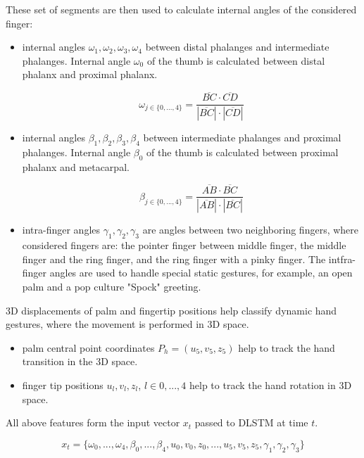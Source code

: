 These set of segments are then used to calculate internal angles of the considered finger:
\begin{itemize}
    \item internal angles $\omega_1, \omega_2, \omega_3, \omega_4$ between distal phalanges and intermediate phalanges. Internal angle $\omega_0$ of the thumb is calculated between distal phalanx and proximal phalanx.
    
    \begin{equation}
        {\omega_{j \in \{0, ..., 4\}} = \frac{\overline{BC} \cdot \overline{CD}}{|\overline{BC}| \cdot |\overline{CD}|}}
    \end{equation}

    \item internal angles $\beta_1, \beta_2, \beta_3, \beta_4$ between intermediate phalanges and proximal phalanges. Internal angle $\beta_0$ of the thumb is calculated between proximal phalanx and metacarpal.
    
    \begin{equation}
        {\beta_{j \in \{0, ..., 4\}} = \frac{\overline{AB} \cdot \overline{BC}}{|\overline{AB}| \cdot |\overline{BC}|}}
    \end{equation}
    
    \item intra-finger angles $\gamma_1, \gamma_2, \gamma_3$ are angles between two neighboring fingers, where considered fingers are: the pointer finger between middle finger, the middle finger and the ring finger, and the ring finger with a pinky finger. The intfra-finger angles are used to handle special static gestures,  for example, an open palm and a pop culture "Spock" greeting.
\end{itemize}


3D displacements of palm and fingertip positions help classify dynamic hand gestures, where the movement is performed in 3D space.


\begin{itemize}
    \item palm central point coordinates $P_h = (u_5, v_5, z_5)$ help to track the hand transition in the 3D space.
    \item finger tip positions $u_l, v_l, z_l$, $l \in {0, ..., 4}$ help to track the hand rotation in 3D space.
\end{itemize}

All above features form the input vector $x_t$ passed to DLSTM at time $t$.

\begin{equation}
    {x_t = \{\omega_0, ...,\omega_4, \beta_0, ..., \beta_4, u_0,v_0,z_0, ..., u_5,v_5,z_5, \gamma_1, \gamma_2, \gamma_3\}}
\end{equation}

